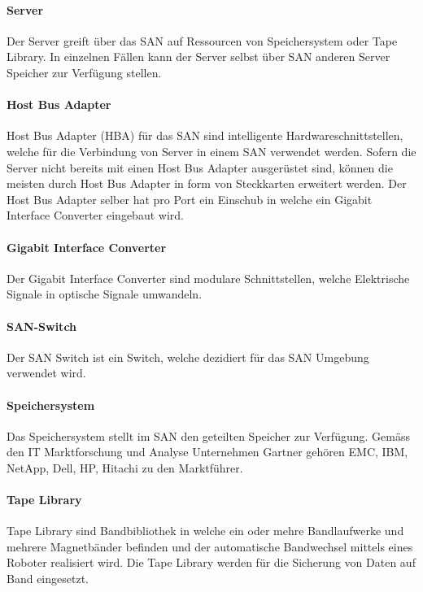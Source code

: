 \paragraph*{Server} 
Der Server greift über das SAN auf Ressourcen von Speichersystem oder Tape Library. In einzelnen Fällen kann der Server selbst über SAN anderen Server Speicher zur Verfügung stellen.

\paragraph*{Host Bus Adapter}
Host Bus Adapter (HBA) für das SAN sind intelligente Hardwareschnittstellen, welche für die Verbindung von Server in einem SAN verwendet werden. Sofern die Server nicht bereits mit einen Host Bus Adapter ausgerüstet sind, können die meisten durch Host Bus Adapter in form von Steckkarten erweitert werden. Der Host Bus Adapter selber hat pro Port ein Einschub in welche ein Gigabit Interface Converter eingebaut wird. \cite{Christopher2009}

\paragraph*{Gigabit Interface Converter}
Der Gigabit Interface Converter sind modulare Schnittstellen, welche Elektrische Signale in optische Signale umwandeln.\cite{SNIA2011}

\paragraph*{SAN-Switch}
Der SAN Switch ist ein Switch, welche dezidiert für das SAN Umgebung verwendet wird.

\paragraph*{Speichersystem}
Das Speichersystem stellt im SAN den geteilten Speicher zur Verfügung. Gemäss den IT Marktforschung und Analyse Unternehmen Gartner gehören EMC, IBM, NetApp, Dell, HP, Hitachi zu den Marktführer\cite{RogerW.CoxPushanRinnenStanleyZaffos2011}.

\paragraph*{Tape Library}
Tape Library sind Bandbibliothek in welche ein oder mehre Bandlaufwerke und mehrere Magnetbänder befinden und der automatische Bandwechsel mittels eines Roboter realisiert wird. Die Tape Library werden für die Sicherung von Daten auf Band eingesetzt.


